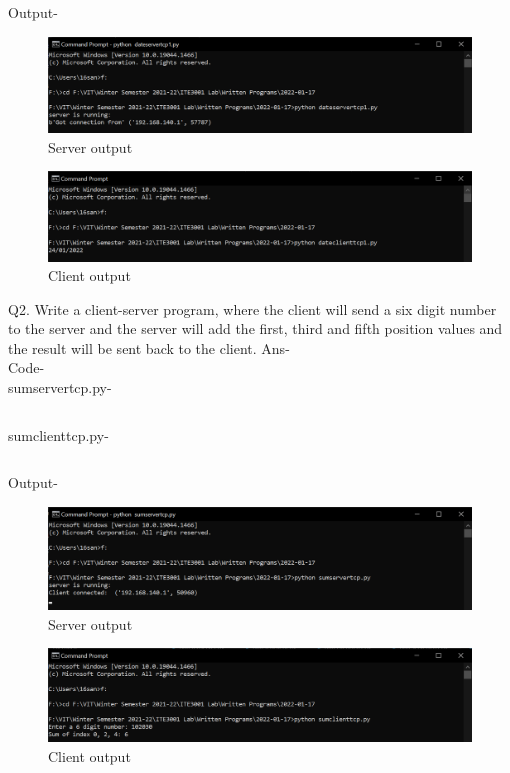 \documentclass[12pt]{article}
\begin{document}
Output-
\begin{figure}[h] %
\centering
\includegraphics[width=\textwidth]{dateservertcp1.png}
\caption{Server output}
\end{figure}
\begin{figure}[h] %
\centering
\includegraphics[width=\textwidth]{dateclienttcp1.png}
\caption{Client output}
\end{figure}
\newline
Q2. Write a client-server program, where the client will send a six digit number to the server and the server will add the first, third and fifth position values and the result will be sent back to the client. \newline
Ans- \\ Code- \\ sumservertcp.py-\inputminted{python}{sumservertcp.py}
sumclienttcp.py- \inputminted{python}{sumclienttcp.py}
\newpage
Output-
\begin{figure}[h] %
\centering
\includegraphics[width=\textwidth]{sumservertcp.png}
\caption{Server output}
\end{figure}
\begin{figure}[h] %
\centering
\includegraphics[width=\textwidth]{sumclienttcp.png}
\caption{Client output}
\end{figure}
\newline
\end{document}
